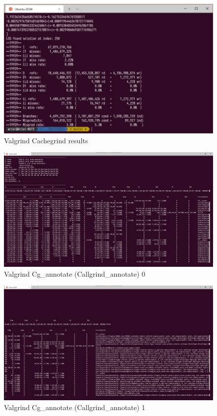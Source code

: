 \begin{figure}[H]
    \includegraphics[width=\columnwidth]{figs/valgrind_cachegrind_results}
    \caption{Valgrind Cachegrind results}
\end{figure}
\begin{figure}[H]
    \includegraphics[width=\columnwidth]{figs/valgrind_cg_annotate0}
    \caption{Valgrind Cg\_annotate (Callgrind\_annotate) 0}
\end{figure}
\begin{figure}[H]
    \includegraphics[width=\columnwidth]{figs/valgrind_cg_annotate1}
    \caption{Valgrind Cg\_annotate (Callgrind\_annotate) 1}
\end{figure}

